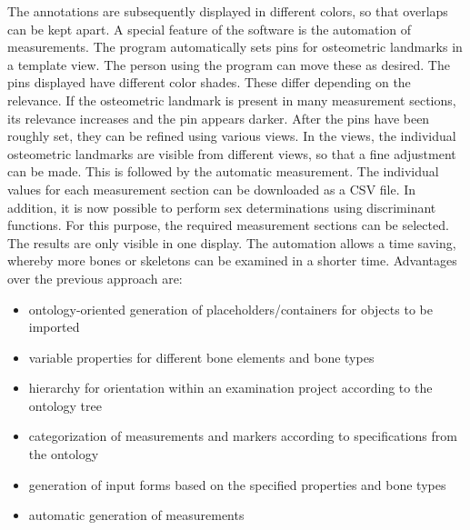 \documentclass[sw]{iosart2x}
\begin{document}
The annotations are subsequently displayed in different colors, so that overlaps can be kept apart.
A special feature of the software is the automation of measurements.
The program automatically sets pins for osteometric landmarks in a template view.
The person using the program can move these as desired.
The pins displayed have different color shades.
These differ depending on the relevance.
If the osteometric landmark is present in many measurement sections, its relevance increases and the pin appears darker.
After the pins have been roughly set, they can be refined using various views.
In the views, the individual osteometric landmarks are visible from different views, so that a fine adjustment can be made.
This is followed by the automatic measurement.
The individual values for each measurement section can be downloaded as a CSV file.
In addition, it is now possible to perform sex determinations using discriminant functions.
For this purpose, the required measurement sections can be selected.
The results are only visible in one display.
The automation allows a time saving, whereby more bones or skeletons can be examined in a shorter time.
Advantages over the previous approach are:

\begin{itemize}
\item ontology-oriented generation of placeholders/containers for objects to be imported
\item variable properties for different bone elements and bone types
\item hierarchy for orientation within an examination project according to the ontology tree
\item categorization of measurements and markers according to specifications from the ontology
\item generation of input forms based on the specified properties and bone types
\item automatic generation of measurements
\end{itemize}

\end{document}
